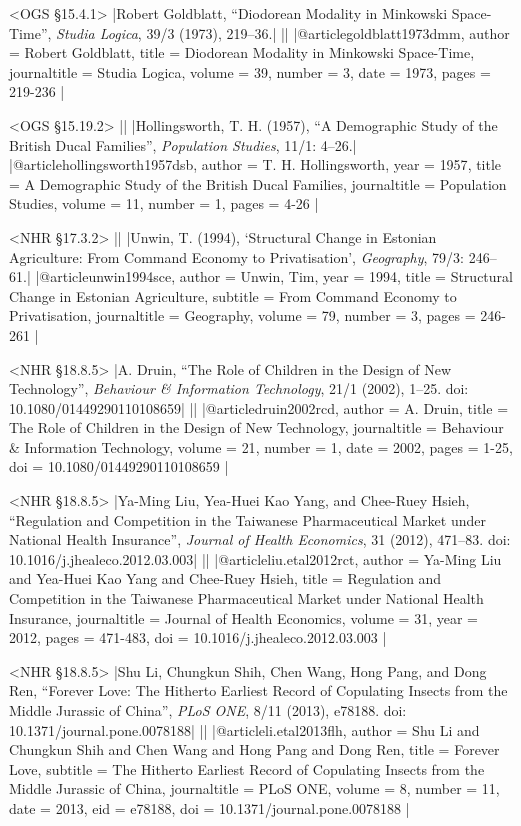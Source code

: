 \documentclass[extrafontsizes,11pt,a4paper,oneside]{memoir}
\begin{document}
\bibexample<OGS \S15.4.1>
|Robert Goldblatt, \enquote{Diodorean Modality in Minkowski Space-Time}, \emph{Studia Logica}, 39/3 (1973), 219--36.|%
||%
|@article{goldblatt1973dmm,
  author = {Robert Goldblatt},
  title = {Diodorean Modality in Minkowski Space-Time},
  journaltitle = {Studia Logica},
  volume = {39},
  number = {3},
  date = {1973},
  pages = {219-236}
}|

\bibexample<OGS \S15.19.2>
||%
|Hollingsworth, T. H. (1957), \enquote{A Demographic Study of the British Ducal Families}, \emph{Population Studies}, 11/1: 4–26.|%
|@article{hollingsworth1957dsb,
  author = {T. H. Hollingsworth},
  year = {1957},
  title = {A Demographic Study of the British Ducal Families},
  journaltitle = {Population Studies},
  volume = {11},
  number = {1},
  pages = {4-26}
}|

\bibexample<NHR \S17.3.2>
||%
|Unwin, T. (1994), ‘Structural Change in Estonian Agriculture: From Command Economy to Privatisation’, \emph{Geography}, 79/3: 246–61.|%
|@article{unwin1994sce,
  author = {Unwin, Tim},
  year = {1994},
  title = {Structural Change in Estonian Agriculture},
  subtitle = {From Command Economy to Privatisation},
  journaltitle = {Geography},
  volume = {79},
  number = {3},
  pages = {246-261}
}|

\bibexample<NHR \S18.8.5>
|A. Druin, \enquote{The Role of Children in the Design of New Technology}, \emph{Behaviour \& Information Technology}, 21/1 (2002), 1–25. doi: 10.1080/01449290110108659|%
||%
|@article{druin2002rcd,
  author = {A. Druin},
  title = {The Role of Children in the Design of New Technology},
  journaltitle = {Behaviour \& Information Technology},
  volume = {21},
  number = {1},
  date = {2002},
  pages = {1-25},
  doi = {10.1080/01449290110108659}
}|

\bibexample<NHR \S18.8.5>
|Ya-Ming Liu, Yea-Huei Kao Yang, and Chee-Ruey Hsieh, \enquote{Regulation and Competition in the Taiwanese Pharmaceutical Market under National Health Insurance}, \emph{Journal of Health Economics}, 31 (2012), 471–83. doi: 10.1016/j.jhealeco.2012.03.003|%
||%
|@article{liu.etal2012rct,
  author = {Ya-Ming Liu and Yea-Huei Kao Yang and Chee-Ruey Hsieh},
  title = {Regulation and Competition in the Taiwanese Pharmaceutical Market under National Health Insurance},
  journaltitle = {Journal of Health Economics},
  volume = {31},
  year = {2012},
  pages = {471-483},
  doi = {10.1016/j.jhealeco.2012.03.003}
}|

\bibexample<NHR \S18.8.5>
|Shu Li, Chungkun Shih, Chen Wang, Hong Pang, and Dong Ren, \enquote{Forever Love: The Hitherto Earliest Record of Copulating Insects from the Middle Jurassic of China}, \emph{PLoS ONE}, 8/11 (2013), e78188. doi: 10.1371/journal.pone.0078188|%
||%
|@article{li.etal2013flh,
  author = {Shu Li and Chungkun Shih and Chen Wang and Hong Pang and Dong Ren},
  title = {Forever Love},
  subtitle = {The Hitherto Earliest Record of Copulating Insects from the Middle Jurassic of China},
  journaltitle = {PLoS ONE},
  volume = {8},
  number = {11},
  date = {2013},
  eid = {e78188},
  doi = {10.1371/journal.pone.0078188}
}|
\end{document}

